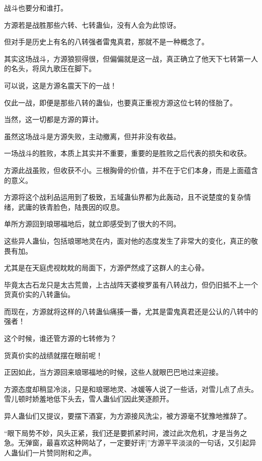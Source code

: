 
\begin{this_body}

战斗也要分和谁打。

方源若是战胜那些六转、七转蛊仙，没有人会为此惊讶。

但对手是历史上有名的八转强者雷鬼真君，那就不是一种概念了。

其实这场战斗，方源狼狈得很，但偏偏就是这一战，真正确立了他天下七转第一人的名头，将凤九歌压在脚下。

可以说，这是方源名震天下的一战！

仅此一战，即便是那些八转的蛊仙，也要真正重视方源这位七转的怪胎了。

当然，这一切都是方源的算计。

虽然这场战斗是方源失败，主动撤离，但并非没有收益。

一场战斗的胜败，本质上其实并不重要，重要的是胜败之后代表的损失和收获。

方源此战虽败，但收获不小。三根胸骨的价值，并不在于它们本身，而是上面蕴含的意义。

方源将这个战利品运用到了极致，五域蛊仙界都为此轰动，且不说楚度的复杂情绪，武庸的铁青脸色，陆畏因的叹息。

单所方源回到琅琊福地后，就立即感受到了很大的不同。

这些异人蛊仙，包括琅琊地灵在内，面对他的态度发生了非常大的变化，真正的敬畏有加。

尤其是在天庭虎视眈眈的局面下，方源俨然成了这群人的主心骨。

毕竟太古石龙只是太古荒兽，上古战阵天婆梭罗虽有八转战力，但仍旧抵不上一个货真价实的八转蛊仙。

而现在，方源就将这样的八转蛊仙痛揍一番，尤其是雷鬼真君还是公认的八转中的强者！

这个时候，谁还管方源的七转修为？

货真价实的战绩就摆在眼前呢！

正因如此，当方源回来琅琊福地的时候，这些人就眼巴巴地过来迎接。

方源态度却稍显冷淡，只是和琅琊地灵、冰媛等人说了一些话，对雪儿点了点头。雪儿顿时娇羞地低下头去，雪人蛊仙们因此笑逐颜开。

异人蛊仙们又提议，要摆下酒宴，为方源接风洗尘，被方源毫不犹豫地推辞了。

“眼下局势不妙，风头正紧，我们还是要抓紧时间，渡过此次危机，才是当务之急。无弹窗，最喜欢这种网站了，一定要好评]”方源平平淡淡的一句话，又引起异人蛊仙们一片赞同附和之声。


\end{this_body}
